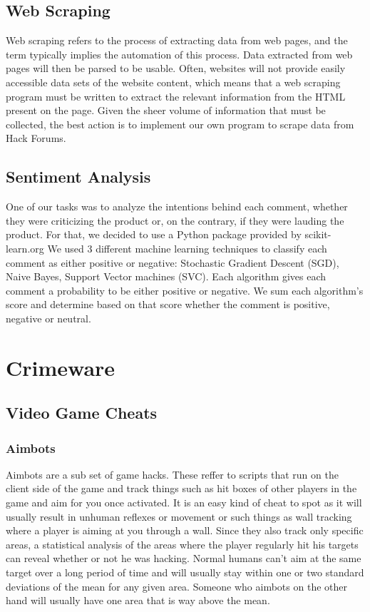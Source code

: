 \documentclass[sigconf]{acmart}
\begin{document}
\subsection{Web Scraping}
Web scraping refers to the process of extracting data from web pages, and the 
term typically implies the automation of this process. Data extracted from web
pages will then be parsed to be usable. Often, websites will not provide 
easily accessible data sets of the website content, which means that a 
web scraping program must be written to extract the relevant information from
the HTML present on the page. Given the sheer volume of information that must
be collected, the best action is to implement our own program to scrape data 
from Hack Forums.

\subsection{Sentiment Analysis}
One of our tasks was to analyze the intentions behind each comment, whether
they were criticizing the product or, on the contrary, if they were lauding
the product. For that, we decided to use a Python package provided by scikit-learn.org
We used 3 different machine learning techniques to classify each comment as
either positive or negative: Stochastic Gradient Descent (SGD), Naive Bayes, 
Support Vector machines (SVC). Each algorithm gives each comment a probability to be either positive or negative. We sum each algorithm's score and determine based on that score whether the comment is positive, negative or neutral.


\section{Crimeware}

\subsection{Video Game Cheats}

\subsubsection{Aimbots}
Aimbots are a sub set of game hacks. These reffer to scripts that run on the client side of the game 
and track things such as hit boxes of other players in the game and aim for you once activated. It is 
an easy kind of cheat to spot as it will usually result in unhuman reflexes or movement or such things 
as wall tracking where a player is aiming at you through a wall. Since they also track only specific 
areas, a statistical analysis of the areas where the player regularly hit his targets can reveal whether 
or not he was hacking. Normal humans can't aim at the same target over a long period of time and will
usually stay within one or two standard deviations of the mean for any given area. Someone who aimbots 
on the other hand will usually have one area that is way above the mean.
\end{document}
